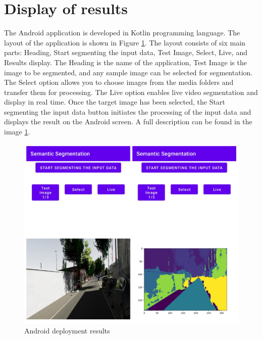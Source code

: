     \section{Display of results}
	
	The Android application is developed in Kotlin programming language. The layout of the application is shown in Figure \ref{fig:android_result}. The layout consists of six main parts: Heading, Start segmenting the input data, Test Image, Select, Live, and Results display. The Heading is the name of the application, Test Image is the image to be segmented, and any sample image can be selected for segmentation. The Select option allows you to choose images from the media folders and transfer them for processing. The Live option enables live video segmentation and display in real time. Once the target image has been selected, the Start segmenting the input data button initiates the processing of the input data and displays the result on the Android screen. A full description can be found in the image \ref{fig:android_result}. 
	
	\begin{figure}
		\centering
		\includegraphics[width=13cm]{images/android_ss.jpg}
		\caption{Android deployment results}
		\label{fig:android_result}
	\end{figure}
    

